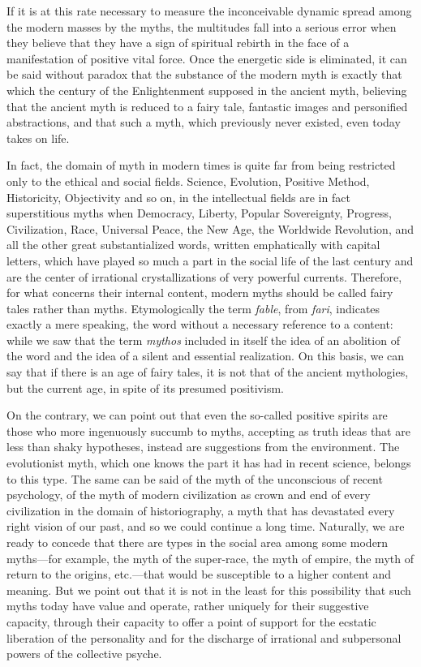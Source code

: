 If it is at this rate necessary to measure the inconceivable dynamic spread among the modern masses by the myths, the multitudes fall into a serious error when they believe that they have a sign of spiritual rebirth in the face of a manifestation of positive vital force. Once the energetic side is eliminated, it can be said without paradox that the substance of the modern myth is exactly that which the century of the Enlightenment supposed in the ancient myth, believing that the ancient myth is reduced to a fairy tale, fantastic images and personified abstractions, and that such a myth, which previously never existed, even today takes on life.

In fact, the domain of myth in modern times is quite far from being restricted only to the ethical and social fields. Science, Evolution, Positive Method, Historicity, Objectivity and so on, in the intellectual fields are in fact superstitious myths when Democracy, Liberty, Popular Sovereignty, Progress, Civilization, Race, Universal Peace, the New Age, the Worldwide Revolution, and all the other great substantialized words, written emphatically with capital letters, which have played so much a part in the social life of the last century and are the center of irrational crystallizations of very powerful currents. Therefore, for what concerns their internal content, modern myths should be called fairy tales rather than myths. Etymologically the term \emph{fable}, from \emph{fari}, indicates exactly a mere speaking, the word without a necessary reference to a content: while we saw that the term \emph{mythos} included in itself the idea of an abolition of the word and the idea of a silent and essential realization. On this basis, we can say that if there is an age of fairy tales, it is not that of the ancient mythologies, but the current age, in spite of its presumed positivism.

On the contrary, we can point out that even the so-called positive spirits are those who more ingenuously succumb to myths, accepting as truth ideas that are less than shaky hypotheses, instead are suggestions from the environment. The evolutionist myth, which one knows the part it has had in recent science, belongs to this type. The same can be said of the myth of the unconscious of recent psychology, of the myth of modern civilization as crown and end of every civilization in the domain of historiography, a myth that has devastated every right vision of our past, and so we could continue a long time. Naturally, we are ready to concede that there are types in the social area among some modern myths—for example, the myth of the super-race, the myth of empire, the myth of return to the origins, etc.—that would be susceptible to a higher content and meaning. But we point out that it is not in the least for this possibility that such myths today have value and operate, rather uniquely for their suggestive capacity, through their capacity to offer a point of support for the ecstatic liberation of the personality and for the discharge of irrational and subpersonal powers of the collective psyche.

